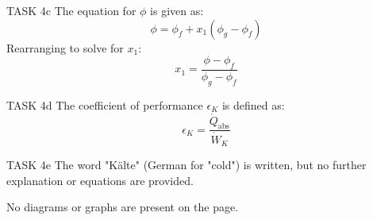 TASK 4c  
The equation for \( \phi \) is given as:  
\[
\phi = \phi_f + x_1 (\phi_g - \phi_f)
\]  
Rearranging to solve for \( x_1 \):  
\[
x_1 = \frac{\phi - \phi_f}{\phi_g - \phi_f}
\]  

TASK 4d  
The coefficient of performance \( \epsilon_K \) is defined as:  
\[
\epsilon_K = \frac{\dot{Q}_{\text{abs}}}{\dot{W}_K}
\]  

TASK 4e  
The word "Kälte" (German for "cold") is written, but no further explanation or equations are provided.  

No diagrams or graphs are present on the page.